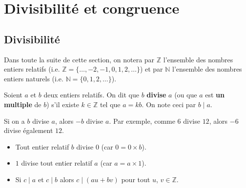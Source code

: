 






	\section{Divisibilité et congruence}

	\subsection{Divisibilité}

	Dans toute la suite de cette section, on notera par $\mathbb{Z}$ l'ensemble des nombres entiers relatifs (i.e. $\mathbb{Z} = \{\dots, -2, -1, 0, 1, 2, \dots\}$) et par $\mathbb{N}$ l'ensemble des nombres entiers naturels (i.e. $\mathbb{N} = \{0, 1, 2, \dots\}$).

	\begin{formula}[Définition]
		Soient $a$ et $b$ deux entiers relatifs. On dit que $b$ \textbf{divise} $a$ (ou que $a$ est \textbf{un multiple} de $b$) s'il existe $k \in \mathbb{Z}$ tel que $a = kb$. On note ceci par $b \mid a$.
	\end{formula}

	\begin{tip}
		Si on a $b$ divise $a$, alors $-b$ divise $a$. Par exemple, comme $6$ divise $12$, alors $-6$ divise également $12$.
	\end{tip}

	\begin{formula}[Propriétés]
		\entretitreetliste
		\begin{itemize}
			\item Tout entier relatif $b$ divise $0$ (car $0 = 0 \times b$).
			\item $1$ divise tout entier relatif $a$ (car $a = a \times 1$).
			\item Si $c \mid a$ et $c \mid b$ alors $c \mid (au + bv)$ pour tout $u$, $v \in \mathbb{Z}$.
		\end{itemize}
	\end{formula}


